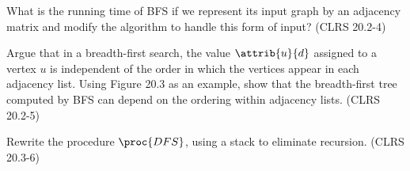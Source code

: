 \documentclass{article}
\begin{document}
\begin{Exercise}[title={Fun creative exercises!}]
    \Question
    What is the running time of BFS if we represent its input graph by an
    adjacency matrix and modify the algorithm to handle this form of input?
    (CLRS 20.2-4)

    \Question
    Argue that in a breadth-first search, the value $\attrib{u}{d}$ assigned to
    a vertex $u$ is independent of the order in which the vertices appear in
    each adjacency list. Using Figure 20.3 as an example, show that the
    breadth-first tree computed by BFS can depend on the ordering within
    adjacency lists. (CLRS 20.2-5)

    \Question
    Rewrite the procedure $\proc{DFS}$, using a stack to eliminate recursion.
    (CLRS 20.3-6)
\end{Exercise}
\end{document}
